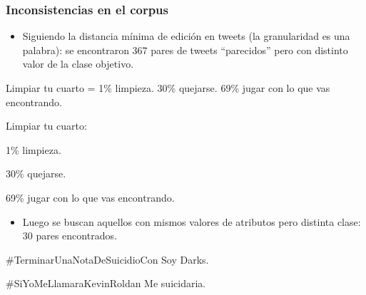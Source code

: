 \begin{frame}[allowframebreaks]
    \frametitle{Inconsistencias en el corpus}

    \begin{itemize}
        \item Siguiendo la distancia mínima de edición en tweets (la granularidad es una palabra): se encontraron 367 pares de tweets ``parecidos'' pero con distinto valor de la clase objetivo.
    \end{itemize}

    \begin{example}
        Limpiar tu cuarto = 1\% limpieza. 30\% quejarse. 69\% jugar con lo que vas encontrando.
    \end{example}

    \begin{example}
        Limpiar tu cuarto:

        1\% limpieza.

        30\% quejarse.

        69\% jugar con lo que vas encontrando.
    \end{example}

    \framebreak

    \begin{itemize}
        \item Luego se buscan aquellos con mismos valores de atributos pero distinta clase: 30 pares encontrados.
    \end{itemize}

    \begin{example}
        \#TerminarUnaNotaDeSuicidioCon Soy Darks.
    \end{example}

    \begin{example}
        \#SiYoMeLlamaraKevinRoldan Me suicidaria.
    \end{example}
\end{frame}

